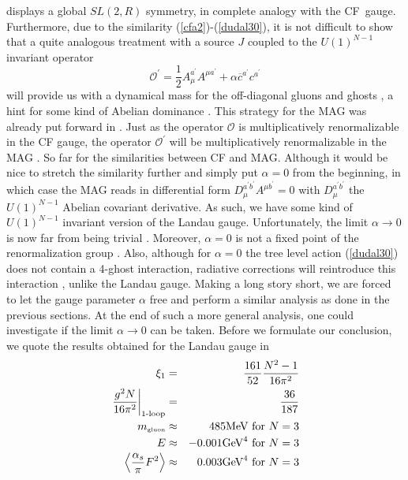 \documentclass[a4paper,12pt]{article}
\newcommand{\text}{\textrm}
\begin{document}
displays a global $SL(2,R)$ symmetry, in complete analogy with the
CF\ gauge. Furthermore, due to the similarity
(\ref{cfa2})-(\ref{dudal30}), it is not difficult to show that a
quite analogous treatment with a source $J$ coupled to the
$U(1)^{N-1}$ invariant operator
\begin{equation}
\mathcal{O}^{\prime }=\frac{1}{2}A_{\mu }^{a^{\prime }}A^{\mu a^{\prime
}}+\alpha \overline{c}^{a^{\prime }}c^{a^{\prime }}  \label{dudal31}
\end{equation}
will provide us with a dynamical mass for the off-diagonal gluons
and ghosts  \cite
{Kondo:2001nq,Dudal:2002ye,Dudal:2002xe,Ellwanger:2002sj}, a hint
for some kind of Abelian dominance \cite{Kondo:2000ey}. This
strategy for the MAG was already put forward in
\cite{Kondo:2001nq}. Just as the operator $\mathcal{O}$ is
multiplicatively renormalizable in the CF gauge, the operator
$\mathcal{O}^{\prime}$ will be multiplicatively renormalizable in
the MAG \cite{Ellwanger:2002sj}. So far for the similarities
between CF and MAG. Although it would be nice to stretch the
similarity further and simply put $\alpha =0$ from the beginning,
in which case the MAG reads in differential form $D_{\mu
}^{a^{\prime }b^{\prime }}A^{\mu b^{\prime }}=0$ with $D_{\mu
}^{a^{\prime }b^{\prime }}$ the $U(1)^{N-1}$ Abelian covariant
derivative. As such, we have some kind of $U(1)^{N-1}$ invariant
version of the Landau gauge. Unfortunately, the limit $\alpha
\rightarrow 0$ is now far from being trivial
\cite{Schaden:1999ew}. Moreover, $\alpha =0$ is not a fixed point
of the renormalization group \cite
{Schaden:1999ew,Shinohara:2001cw}.  Also, although for $\alpha =0$
the tree level action (\ref{dudal30}) does not contain a 4-ghost
interaction, radiative corrections will reintroduce this
interaction \cite{Kondo:1997pc}, unlike the Landau gauge. Making a
long story short, we are forced to let the gauge parameter $\alpha
$ free and perform a similar analysis as done in the previous
sections. At the
end of such a more general analysis, one could investigate if the limit $%
\alpha \rightarrow 0$ can be taken. \newline
\newline
Before we formulate our conclusion, we quote the results obtained for the
Landau gauge in \cite{v1}
\begin{eqnarray}
\xi _{1} &=&\frac{161}{52}\frac{N^{2}-1}{16\pi ^{2}}  \nonumber \\
\left. \frac{g^{2}N}{16\pi ^{2}}\right| _{1{\tiny {\text{-loop}}}} &=&\frac{%
36}{187}  \nonumber \\
m_{\text{{\tiny {gluon}}}} &\approx &485\textrm{MeV for }N=3
\nonumber
\\
E &\approx &-0.001\textrm{GeV}^{4}\textrm{ for }N=3  \nonumber \\
\left\langle \frac{\alpha _{s}}{\pi }F^{2}\right\rangle  &\approx &0.003%
\textrm{GeV}^{4}\textrm{ for }N=3
\end{eqnarray}
\end{document}
